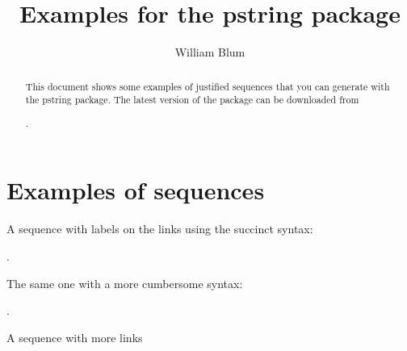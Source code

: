 
%


\author{William Blum}
\title{Examples for the pstring package}

\maketitle
\begin{abstract}
This document shows some examples of justified sequences that you
can generate with the pstring package.
The latest version of the package can be downloaded from %

\begin{codeexample}[width=4cm]
.
\end{codeexample}

\end{abstract}
\section{Examples of sequences}

A sequence with labels on the links using the succinct syntax:
\begin{codeexample}[width=3cm]
.
\end{codeexample}

The same one with a more cumbersome syntax:
\begin{codeexample}[width=4cm]
.
\end{codeexample}


A sequence with more links
\begin{codeexample}[width=7cm]
\end{codeexample}

